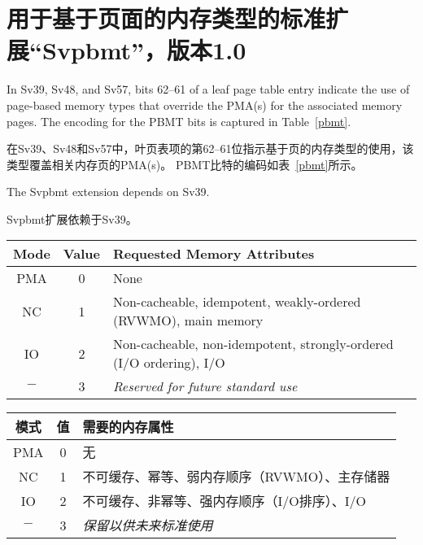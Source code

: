 
\chapter{用于基于页面的内存类型的标准扩展“Svpbmt”，版本1.0}
\label{svpbmt}

In Sv39, Sv48, and Sv57, bits 62--61 of a leaf page table entry indicate the use
of page-based memory types that override the PMA(s) for the associated memory
pages.  The encoding for the PBMT bits is captured in Table~\ref{pbmt}.

在Sv39、Sv48和Sv57中，叶页表项的第62--61位指示基于页的内存类型的使用，该类型覆盖相关内存页的PMA(s)。
PBMT比特的编码如表~\ref{pbmt}所示。

The Svpbmt extension depends on Sv39.

Svpbmt扩展依赖于Sv39。

\begin{table*}[h!]
\begin{center}
\begin{tabular}{|c|c|l|}
\hline
Mode & Value  & Requested Memory Attributes \\
\hline
PMA  & 0      & None \\
NC   & 1      & Non-cacheable, idempotent, weakly-ordered (RVWMO), main memory \\
IO   & 2      & Non-cacheable, non-idempotent, strongly-ordered (I/O ordering), I/O \\
$-$  & 3      & {\em Reserved for future standard use} \\
\hline
\end{tabular}
\end{center}
\caption{Encodings for the PBMT field in Sv39, Sv48, and Sv57 PTEs.  Attributes
not mentioned are inherited from the PMA associated with the physical address.}
\label{pbmt}
\end{table*}

\begin{table*}[h!]
\begin{center}
\begin{tabular}{|c|c|l|}
\hline
模式 & 值  & 需要的内存属性 \\
\hline
PMA  & 0      & 无 \\
NC   & 1      & 不可缓存、幂等、弱内存顺序（RVWMO）、主存储器 \\
IO   & 2      & 不可缓存、非幂等、强内存顺序（I/O排序）、I/O \\
$-$  & 3      & {\em 保留以供未来标准使用} \\
\hline
\end{tabular}
\end{center}
\caption{表6.1：Sv39、Sv48和Sv57 PTEs中PBMT字段的编码。未提及的属性是从与物理地址关联的PMA继承的。}
\label{pbmt}
\end{table*}

